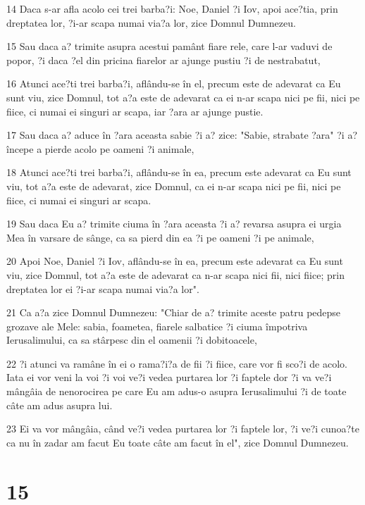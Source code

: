 \par 14 Daca s-ar afla acolo cei trei barba?i: Noe, Daniel ?i Iov, apoi ace?tia, prin dreptatea lor, ?i-ar scapa numai via?a lor, zice Domnul Dumnezeu.
\par 15 Sau daca a? trimite asupra acestui pamânt fiare rele, care l-ar vaduvi de popor, ?i daca ?el din pricina fiarelor ar ajunge pustiu ?i de nestrabatut,
\par 16 Atunci ace?ti trei barba?i, aflându-se în el, precum este de adevarat ca Eu sunt viu, zice Domnul, tot a?a este de adevarat ca ei n-ar scapa nici pe fii, nici pe fiice, ci numai ei singuri ar scapa, iar ?ara ar ajunge pustie.
\par 17 Sau daca a? aduce în ?ara aceasta sabie ?i a? zice: "Sabie, strabate ?ara" ?i a? începe a pierde acolo pe oameni ?i animale,
\par 18 Atunci ace?ti trei barba?i, aflându-se în ea, precum este adevarat ca Eu sunt viu, tot a?a este de adevarat, zice Domnul, ca ei n-ar scapa nici pe fii, nici pe fiice, ci numai ei singuri ar scapa.
\par 19 Sau daca Eu a? trimite ciuma în ?ara aceasta ?i a? revarsa asupra ei urgia Mea în varsare de sânge, ca sa pierd din ea ?i pe oameni ?i pe animale,
\par 20 Apoi Noe, Daniel ?i Iov, aflându-se în ea, precum este adevarat ca Eu sunt viu, zice Domnul, tot a?a este de adevarat ca n-ar scapa nici fii, nici fiice; prin dreptatea lor ei ?i-ar scapa numai via?a lor".
\par 21 Ca a?a zice Domnul Dumnezeu: "Chiar de a? trimite aceste patru pedepse grozave ale Mele: sabia, foametea, fiarele salbatice ?i ciuma împotriva Ierusalimului, ca sa stârpesc din el oamenii ?i dobitoacele,
\par 22 ?i atunci va ramâne în ei o rama?i?a de fii ?i fiice, care vor fi sco?i de acolo. Iata ei vor veni la voi ?i voi ve?i vedea purtarea lor ?i faptele dor ?i va ve?i mângâia de nenorocirea pe care Eu am adus-o asupra Ierusalimului ?i de toate câte am adus asupra lui.
\par 23 Ei va vor mângâia, când ve?i vedea purtarea lor ?i faptele lor, ?i ve?i cunoa?te ca nu în zadar am facut Eu toate câte am facut în el", zice Domnul Dumnezeu.

\chapter{15}

